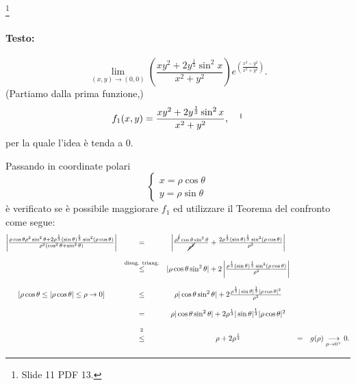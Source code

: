 \begin{example}\footnote{Slide 11 PDF 13.}
	\paragraph{Testo:}
	\begin{equation*}
		\lim_{(x,y)\rightarrow(0,0)}\left(\frac{xy^2+2y^{\frac{1}{3}}\sin^2x}{x^2+y^2}\right)e^{\left(\frac{x^2-y^2}{x^2+y^2}\right)}.
	\end{equation*}
	(Partiamo dalla prima funzione,)
	\begin{equation*}
		f_1(x,y) = \frac{xy^2+2y^{\frac{1}{3}}\sin^2x}{x^2+y^2},\quad \footnotemark
	\end{equation*}
	per la quale l'idea è tenda a 0. 
	
	\noindent Passando in coordinate polari
	\begin{equation*}
		\begin{cases}
			x = \rho \cos\theta\\
			y = \rho \sin\theta
		\end{cases}
	\end{equation*}
	è verificato se è possibile maggiorare $f_1$ ed utilizzare il Teorema del confronto come segue:
	\begin{equation*}
		\begin{matrix}
				\left|\frac{\rho\cos\theta\rho^2\sin^2\theta + 2\rho^{\frac{1}{3}}(\sin\theta)^{\frac{1}{3}}\sin^2(\rho\cos\theta)}{\rho^2(\cos^2\theta+\sin^2\theta)}\right| &=& \left|\frac{\rho^{\cancel 3}\cos\theta\sin^2\theta}{\cancel{\rho^2}} + \frac{ 2\rho^{\frac{1}{3}}(\sin\theta)^{\frac{1}{3}}\sin^2(\rho\cos\theta)}{\rho^2}\right|\\\\
				&\overset{\text{disug. triang.}}{\leq}& |\rho \cos\theta\sin^2\theta| + 2 \left| \frac{ \rho^{\frac{1}{3}}(\sin\theta)^{\frac{1}{3}}\sin^2(\rho\cos\theta)}{\rho^2}\right|\\\\
				[\rho\cos\theta\leq|\rho\cos\theta|\leq\rho\rightarrow 0] &\leq& \rho |\cos\theta\sin^2\theta| + 2  \frac{ \rho^{\frac{1}{3}} |\sin\theta|^{\frac{1}{3}}|\rho\cos\theta|^2}{\rho^2}\\\\
				&=&  \rho |\cos\theta\sin^2\theta| + 2 \rho^{\frac{1}{3}} |\sin\theta|^{\frac{1}{3}}|\rho\cos\theta|^2\\\\
				&\overset{\footnotemark}{\leq}& \rho + 2\rho^{\frac{1}{3}} &=& g(\rho) \underset{\rho\rightarrow 0^+}{\longrightarrow} 0.
		\end{matrix}
	\end{equation*}
	

\end{example}
